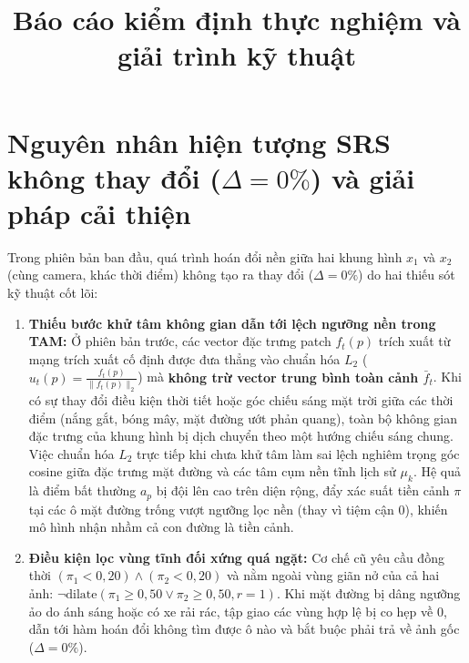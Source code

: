 \documentclass[11pt,a4paper]{article}
\title{\textbf{\LARGE Báo cáo kiểm định thực nghiệm và giải trình kỹ thuật}}
\date{}
\begin{document}
\maketitle
\vspace{-2em}

\section{Nguyên nhân hiện tượng SRS không thay đổi (\texorpdfstring{$\Delta = 0\%$}{Delta = 0\%}) và giải pháp cải thiện}

Trong phiên bản ban đầu, quá trình hoán đổi nền giữa hai khung hình $x_1$ và $x_2$ (cùng camera, khác thời điểm) không tạo ra thay đổi ($\Delta = 0\%$) do hai thiếu sót kỹ thuật cốt lõi:
\begin{enumerate}
    \item \textbf{Thiếu bước khử tâm không gian dẫn tới lệch ngưỡng nền trong TAM:} 
    Ở phiên bản trước, các vector đặc trưng patch $f_t(p)$ trích xuất từ mạng trích xuất cố định được đưa thẳng vào chuẩn hóa $L_2$ ($u_t(p) = \frac{f_t(p)}{\|f_t(p)\|_2}$) mà \textbf{không trừ vector trung bình toàn cảnh $\bar{f}_t$}. Khi có sự thay đổi điều kiện thời tiết hoặc góc chiếu sáng mặt trời giữa các thời điểm (nắng gắt, bóng mây, mặt đường ướt phản quang), toàn bộ không gian đặc trưng của khung hình bị dịch chuyển theo một hướng chiếu sáng chung. Việc chuẩn hóa $L_2$ trực tiếp khi chưa khử tâm làm sai lệch nghiêm trọng góc cosine giữa đặc trưng mặt đường và các tâm cụm nền tĩnh lịch sử $\mu_k$. Hệ quả là điểm bất thường $a_p$ bị đội lên cao trên diện rộng, đẩy xác suất tiền cảnh $\pi$ tại các ô mặt đường trống vượt ngưỡng lọc nền (thay vì tiệm cận $0$), khiến mô hình nhận nhầm cả con đường là tiền cảnh.
    \item \textbf{Điều kiện lọc vùng tĩnh đối xứng quá ngặt:} Cơ chế cũ yêu cầu đồng thời $(\pi_1 < 0{,}20) \land (\pi_2 < 0{,}20)$ và nằm ngoài vùng giãn nở của cả hai ảnh: $\neg\text{dilate}(\pi_1 \ge 0{,}50 \lor \pi_2 \ge 0{,}50, r=1)$. Khi mặt đường bị dâng ngưỡng ảo do ánh sáng hoặc có xe rải rác, tập giao các vùng hợp lệ bị co hẹp về $0$, dẫn tới hàm hoán đổi không tìm được ô nào và bắt buộc phải trả về ảnh gốc ($\Delta = 0\%$).
\end{enumerate}
\end{document}
